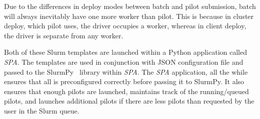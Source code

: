 \documentclass{IEEEtran}
\begin{document}
    Due to the differences in deploy modes between batch and pilot submission, 
    batch will always inevitably have one more worker than pilot. This is because
    in cluster deploy, which pilot uses, the driver occupies a worker, whereas in
    client deploy, the driver is separate from any worker.

    Both of these Slurm templates are launched within a Python application called
    \textit{SPA}. The templates are used in conjunction with JSON configuration 
    file and passed to the SlurmPy~\cite{slurmpy} library within \textit{SPA}.
    The \textit{SPA} application, all the while ensures that all is preconfigured
    correctly before passing it to SlurmPy. It also ensures that enough pilots are
    launched, maintains track of the running/queued pilots, and launches additional
    pilots if there are less pilots than requested by the user in the Slurm queue.
\end{document}
